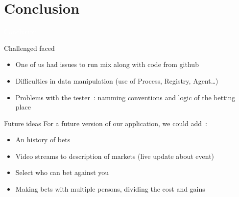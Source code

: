 \documentclass{beamer}
\begin{document}
\section*{Conclusion}
\begin{frame}{}
    \centering
    \begin{cadre}
        \textcolor{white}{
            Conclusion 
        }
    \end{cadre}
\end{frame}

\begin{frame}{Challenged faced}
    \begin{itemize}
        \item One of us had issues to run mix along with code from github 
        \item Difficulties in data manipulation (use of Process, Registry, Agent\dots)
        \item Problems with the tester~: namming conventions and logic of the betting place
    \end{itemize}
\end{frame}

\begin{frame}{Future ideas}
    For a future version of our application, we could add~:
    \begin{itemize}
        \item An history of bets
        \item Video streams to description of markets (live update about event)
        \item Select who can bet against you
        \item Making bets with multiple persons, dividing the cost and gains
    \end{itemize}
\end{frame}
\end{document}
